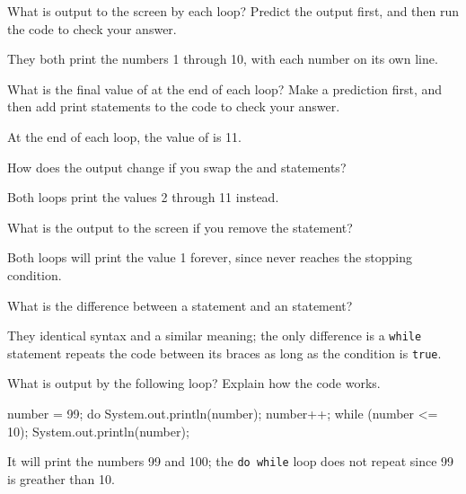 \Q \label{output}
What is output to the screen by each loop?
Predict the output first, and then run the code to check your answer.

\begin{answer}
They both print the numbers 1 through 10, with each number on its own line.
\end{answer}


\Q \label{value}
What is the final value of  at the end of each loop?
Make a prediction first, and then add print statements to the code to check your answer.

\begin{answer}
At the end of each loop, the value of  is 11.
\end{answer}


\Q How does the output change if you swap the  and  statements?

\begin{answer}
Both loops print the values 2 through 11 instead.
\end{answer}


\Q What is the output to the screen if you remove the  statement?

\begin{answer}
Both loops will print the value 1 forever, since  never reaches the stopping condition.
\end{answer}


\Q What is the difference between a  statement and an  statement?

\begin{answer}
They identical syntax and a similar meaning; the only difference is a \texttt{while} statement repeats the code between its braces as long as the condition is \texttt{true}.
\end{answer}


\Q \label{do99}
What is output by the following loop? Explain how the code works.

\begin{minipage}{0.49\textwidth}
\begin{javalst}
    number = 99;
    do {
        System.out.println(number);
        number++;
    } while (number <= 10);
    System.out.println(number);
\end{javalst}
\end{minipage}
\hfill
\begin{minipage}{0.49\textwidth}
\begin{answer}[5em]
It will print the numbers 99 and 100; the \texttt{do while} loop does not repeat since 99 is greather than 10.
\end{answer}
\end{minipage}
\vspace{1ex}


